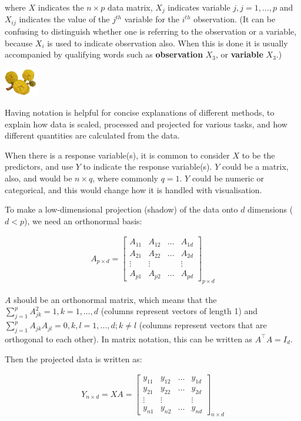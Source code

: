 \documentclass[
  letterpaper,
]{krantz}
\newcommand{\infobox}[1]{%
\noindent\colorbox{info!30}{%
\begin{minipage}{0.98\linewidth}%
    \centering%
    \begin{minipage}[c]{0.15\linewidth} %
      \includegraphics[width=1.5cm]{images/mulga-flowers2.png} %
    \end{minipage}%
    \hfill %
    \begin{minipage}[c]{0.8\linewidth} %
      \bigskip%
      \textsf{#1}%
      \bigskip%
    \end{minipage}%
    \hspace*{3mm}%
  \end{minipage}%
}%
}
\begin{document}
where \(X\) indicates the \(n\times p\) data matrix, \(X_j\) indicates
variable \(j, j=1, \dots, p\) and \(X_{ij}\) indicates the value of the
\(j^{th}\) variable for the \(i^{th}\) observation. (It can be confusing
to distinguish whether one is referring to the observation or a
variable, because \(X_i\) is used to indicate observation also. When
this is done it is usually accompanied by qualifying words such as
\textbf{observation} \(X_3\), or \textbf{variable} \(X_3\).)

\infobox{Having notation is helpful for concise explanations of different methods, to explain how data is scaled, processed and projected for various tasks, and how different quantities are calculated from the data. }

When there is a response variable(s), it is common to consider \(X\) to
be the predictors, and use \(Y\) to indicate the response variable(s).
\(Y\) could be a matrix, also, and would be \(n\times q\), where
commonly \(q=1\). \(Y\) could be numeric or categorical, and this would
change how it is handled with visualisation.

To make a low-dimensional projection (shadow) of the data onto \(d\)
dimensions (\(d < p\)), we need an orthonormal basis:

\begin{eqnarray*}
A_{p\times d} = \left[ \begin{array}{cccc}
A_{11} & A_{12} & \dots & A_{1d} \\
A_{21} & A_{22} & \dots & A_{2d}\\
\vdots & \vdots &  & \vdots \\
A_{p1} & A_{p2} & \dots & A_{pd} \end{array} \right]_{p\times d}
\end{eqnarray*}

\(A\) should be an orthonormal matrix, which means that the
\(\sum_{j=1}^p A_{jk}^2=1, k=1, \dots, d\) (columns represent vectors of
length 1) and \(\sum_{j=1}^p A_{jk}A_{jl}=0, k,l=1, \dots, d; k\neq l\)
(columns represent vectors that are orthogonal to each other). In matrix
notation, this can be written as \(A^{\top}A = I_d\).

Then the projected data is written as:

\begin{eqnarray*}
Y_{n\times d} = XA = \left[ \begin{array}{cccc}
y_{11} & y_{12} & \dots & y_{1d} \\
y_{21} & y_{22} & \dots & y_{2d}\\
\vdots & \vdots &  & \vdots \\
y_{n1} & y_{n2} & \dots & y_{nd} \end{array} \right]_{n\times d}
\end{eqnarray*}
\end{document}
